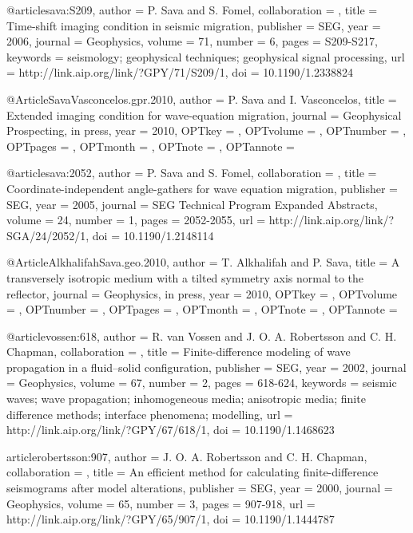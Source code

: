 @article{sava:S209,
author = {P. Sava and S. Fomel},
collaboration = {},
title = {Time-shift imaging condition in seismic migration},
publisher = {SEG},
year = {2006},
journal = {Geophysics},
volume = {71},
number = {6},
pages = {S209-S217},
keywords = {seismology; geophysical techniques; geophysical signal processing},
url = {http://link.aip.org/link/?GPY/71/S209/1},
doi = {10.1190/1.2338824}
}



@Article{SavaVasconcelos.gpr.2010,
  author = 	 {P. Sava and I. Vasconcelos},
  title = 	 {Extended imaging condition for wave-equation migration},
  journal = 	 {Geophysical Prospecting, in press},
  year = 	 {2010},
  OPTkey = 	 {},
  OPTvolume = 	 {},
  OPTnumber = 	 {},
  OPTpages = 	 {},
  OPTmonth = 	 {},
  OPTnote = 	 {},
  OPTannote = 	 {}
}



@article{sava:2052,
author = {P. Sava and S. Fomel},
collaboration = {},
title = {Coordinate-independent angle-gathers for wave equation migration},
publisher = {SEG},
year = {2005},
journal = {SEG Technical Program Expanded Abstracts},
volume = {24},
number = {1},
pages = {2052-2055},
url = {http://link.aip.org/link/?SGA/24/2052/1},
doi = {10.1190/1.2148114}
}


@Article{AlkhalifahSava.geo.2010,
  author = 	 {T. Alkhalifah and P. Sava},
  title = 	 {A transversely isotropic medium with a tilted
                  symmetry axis normal to the reflector},
  journal = 	 {Geophysics, in press},
  year = 	 {2010},
  OPTkey = 	 {},
  OPTvolume = 	 {},
  OPTnumber = 	 {},
  OPTpages = 	 {},
  OPTmonth = 	 {},
  OPTnote = 	 {},
  OPTannote = 	 {}
}


@article{vossen:618,
author = {R. van Vossen and J. O. A. Robertsson and C. H. Chapman},
collaboration = {},
title = {Finite-difference modeling of wave propagation in a fluid--solid configuration},
publisher = {SEG},
year = {2002},
journal = {Geophysics},
volume = {67},
number = {2},
pages = {618-624},
keywords = {seismic waves; wave propagation; inhomogeneous media; anisotropic media; finite difference methods; interface phenomena; modelling},
url = {http://link.aip.org/link/?GPY/67/618/1},
doi = {10.1190/1.1468623}
}

article{robertsson:907,
author = {J. O. A. Robertsson and C. H. Chapman},
collaboration = {},
title = {An efficient method for calculating finite-difference seismograms after model alterations},
publisher = {SEG},
year = {2000},
journal = {Geophysics},
volume = {65},
number = {3},
pages = {907-918},
url = {http://link.aip.org/link/?GPY/65/907/1},
doi = {10.1190/1.1444787}
}

